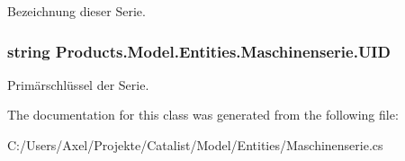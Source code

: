 Bezeichnung dieser Serie. 

\subsubsection[{\texorpdfstring{U\+ID}{UID}}]{\setlength{\rightskip}{0pt plus 5cm}string Products.\+Model.\+Entities.\+Maschinenserie.\+U\+ID\hspace{0.3cm}{\ttfamily [get]}}\hypertarget{class_products_1_1_model_1_1_entities_1_1_maschinenserie_a46db3f3ce980cb47914a361d5079da99}{}\label{class_products_1_1_model_1_1_entities_1_1_maschinenserie_a46db3f3ce980cb47914a361d5079da99}


Primärschlüssel der Serie. 



The documentation for this class was generated from the following file\+:\begin{DoxyCompactItemize}
\item 
C\+:/\+Users/\+Axel/\+Projekte/\+Catalist/\+Model/\+Entities/Maschinenserie.\+cs\end{DoxyCompactItemize}
